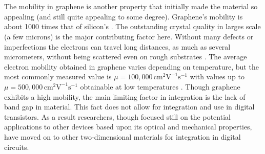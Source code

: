 \documentclass[%
 reprint,
 amsmath,amssymb,
 aps,
pra,
floatfix,
]{revtex4-1}
\begin{document}
\\ \\
The mobility in graphene is another property that initially made the material so appealing (and still quite appealing to some degree). Graphene's mobility is about 1000 times that of silicon's \cite{Dargys1994, 2DflexibleNanoElectronics2014}. The outstanding crystal quality in larges scale (a few microns) is the major contributing factor here. Without many defects or imperfections the electrons can travel long distances, as much as several micrometers, without being scattered even on rough substrates \cite{nanoscaleReview2011, Du2008}. The average electron mobility obtained in graphene varies depending on temperature, but the most commonly measured value is $\mu = 100,000\mathrm{\,cm}^2\mathrm{V}^{-1}\mathrm{s}^{-1}$ with values up to $\mu = 500,000\mathrm{\,cm}^2\mathrm{V}^{-1}\mathrm{s}^{-1}$ obtainable at low temperatures \cite{vanderWaalsHeterostruct2013}. Though graphene exhibits a high mobility, the main limiting factor in integration is the lack of band gap in material. This fact does not allow for integration and use in digital transistors. As a result researchers, though focused still on the potential applications to other devices based upon its optical and mechanical properties, have moved on to other two-dimensional materials for integration in digital circuits.
\end{document}
